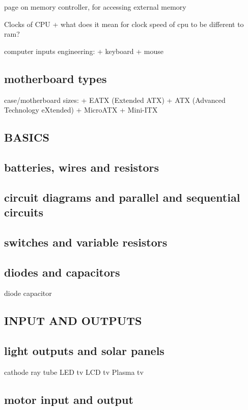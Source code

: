 page on memory controller, for accessing external memory

Clocks of CPU
+ what does it mean for clock speed of cpu to be different to ram?

computer inputs engineering:
+ keyboard
+ mouse

\subsection{motherboard types}

case/motherboard sizes:
+ EATX (Extended ATX)
+ ATX (Advanced Technology eXtended)
+ MicroATX
+ Mini-ITX

\subsection{BASICS}

\subsection{batteries, wires and resistors}

\subsection{circuit diagrams and parallel and sequential circuits}

\subsection{switches and variable resistors}

\subsection{diodes and capacitors}

diode
capacitor

\subsection{INPUT AND OUTPUTS}

\subsection{light outputs and solar panels}

cathode ray tube
LED tv
LCD tv
Plasma tv
\subsection{motor input and output}

